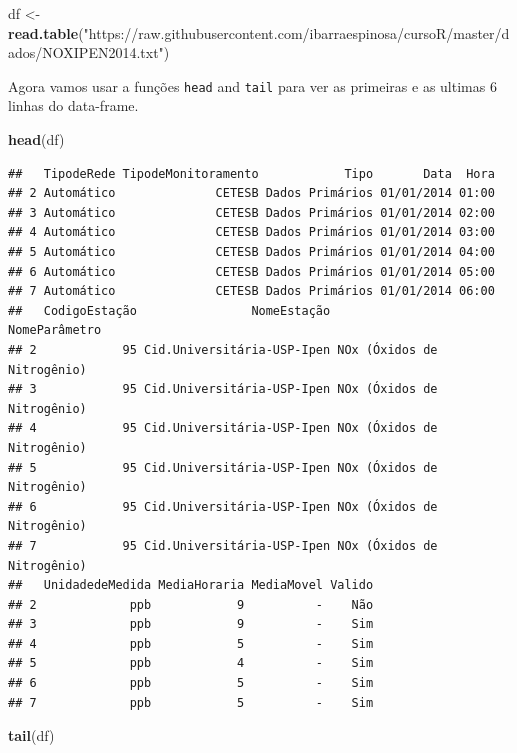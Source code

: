 \documentclass[]{book}
\newenvironment{Shaded}{\begin{snugshade}}{\end{snugshade}}
\newcommand{\KeywordTok}[1]{\textcolor[rgb]{0.13,0.29,0.53}{\textbf{#1}}}
\newcommand{\StringTok}[1]{\textcolor[rgb]{0.31,0.60,0.02}{#1}}
\newcommand{\NormalTok}[1]{#1}
\theoremstyle{definition}
\theoremstyle{definition}
\theoremstyle{definition}
\theoremstyle{remark}
\begin{document}
\begin{Shaded}
\begin{Highlighting}[]
\NormalTok{df <-}\StringTok{ }\KeywordTok{read.table}\NormalTok{(}\StringTok{"https://raw.githubusercontent.com/ibarraespinosa/cursoR/master/dados/NOXIPEN2014.txt"}\NormalTok{)}
\end{Highlighting}
\end{Shaded}

Agora vamos usar a funções \texttt{head} and \texttt{tail} para ver as
primeiras e as ultimas 6 linhas do data-frame.

\begin{Shaded}
\begin{Highlighting}[]
\KeywordTok{head}\NormalTok{(df)}
\end{Highlighting}
\end{Shaded}

\begin{verbatim}
##   TipodeRede TipodeMonitoramento            Tipo       Data  Hora
## 2 Automático              CETESB Dados Primários 01/01/2014 01:00
## 3 Automático              CETESB Dados Primários 01/01/2014 02:00
## 4 Automático              CETESB Dados Primários 01/01/2014 03:00
## 5 Automático              CETESB Dados Primários 01/01/2014 04:00
## 6 Automático              CETESB Dados Primários 01/01/2014 05:00
## 7 Automático              CETESB Dados Primários 01/01/2014 06:00
##   CodigoEstação                NomeEstação              NomeParâmetro
## 2            95 Cid.Universitária-USP-Ipen NOx (Óxidos de Nitrogênio)
## 3            95 Cid.Universitária-USP-Ipen NOx (Óxidos de Nitrogênio)
## 4            95 Cid.Universitária-USP-Ipen NOx (Óxidos de Nitrogênio)
## 5            95 Cid.Universitária-USP-Ipen NOx (Óxidos de Nitrogênio)
## 6            95 Cid.Universitária-USP-Ipen NOx (Óxidos de Nitrogênio)
## 7            95 Cid.Universitária-USP-Ipen NOx (Óxidos de Nitrogênio)
##   UnidadedeMedida MediaHoraria MediaMovel Valido
## 2             ppb            9          -    Não
## 3             ppb            9          -    Sim
## 4             ppb            5          -    Sim
## 5             ppb            4          -    Sim
## 6             ppb            5          -    Sim
## 7             ppb            5          -    Sim
\end{verbatim}

\begin{Shaded}
\begin{Highlighting}[]
\KeywordTok{tail}\NormalTok{(df)}
\end{Highlighting}
\end{Shaded}
\end{document}
